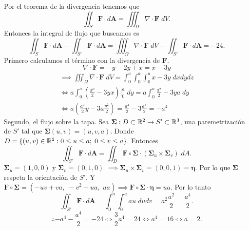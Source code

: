 \begin{solution}
  Por el teorema de la divergencia tenemos que
  \[
    \iint_S \mathbf{F}\cdot d\mathbf{A}=\iiint_\Omega \nabla \cdot \mathbf{F}\;dV.
  \]
  Entonces la integral de flujo que buscamos es
  \[
    \iint_S \mathbf{F}\cdot d\mathbf{A} - \iint_{S'} \mathbf{F}\cdot d\mathbf{A}=
    \iiint_\Omega \nabla \cdot \mathbf{F}\;dV - \iint_{S'} \mathbf{F}\cdot d\mathbf{A}=-24.
  \]
  Primero calculamos el t\'ermino con la divergencia de $\mathbf{F}$.
  \[
    \nabla\cdot\mathbf{F}=-y-2y+x=x-3y
  \]
  \begin{gather*}
    \implies\iiint_\Omega\nabla\cdot\mathbf{F}\;dV=\int_0^a \int_0^a \int_0^a x-3y\;dxdydz\\[.2cm]
    \iff a\int_0^a \left(\frac{x^2}{2}-3yx\right)\Bigg|_0^a\;dy=a\int_0^a \frac{a^2}{2}-3ya\;dy\\[.2cm]
    \iff a\left( \frac{a^2}{2}y-3a\frac{y^2}{2} \right)=\frac{a^4}{2}-3\frac{a^4}{2}=-a^4
  \end{gather*}
  Segundo, el flujo sobre la tapa. Sea $\boldsymbol{\Sigma} : D\subset\mathbb{R}^2\to S'\subset\mathbb{R}^3$, una paremetrizaci\'on de $S'$ tal que $\boldsymbol{\Sigma}(u,v)=(u,v,a)$. Donde $D = \{(u,v)\in\mathbb{R}^2:0\leq u\leq a;\;0\leq v \leq a\}$. Entonces
  \[
    \iint_{S'} \mathbf{F}\cdot d\mathbf{A}=\iint_D \mathbf{F}\circ\boldsymbol{\Sigma} \cdot (\boldsymbol{\Sigma}_u\times\boldsymbol{\Sigma}_v)\;dA.
  \]
  $\boldsymbol{\Sigma}_u=(1,0,0)$ y $\boldsymbol{\Sigma}_v=(0,1,0)$ $\implies \boldsymbol{\Sigma}_u\times\boldsymbol{\Sigma}_v=(0,0,1)=\boldsymbol{\eta}$. Por lo que $\boldsymbol{\Sigma}$ respeta la orientaci\'on de $S'$. Y $\mathbf{F}\circ\boldsymbol{\Sigma}=(-uv+va,\;-v^2+ua,\;ua) \implies \mathbf{F}\circ\boldsymbol{\Sigma}\cdot\boldsymbol{\eta}=ua$. Por lo tanto
  \[
    \iint_{S'} \mathbf{F}\cdot d\mathbf{A}=\int_0^a\int_0^a au\;dudv=a^2\frac{a^2}{2}=\frac{a^4}{2}.
  \]
  \[
    \therefore -a^4-\frac{a^4}{2}=-24\iff \frac{3}{2}a^4=24\iff a^4=16 \iff a=2.
  \]

\end{solution}


